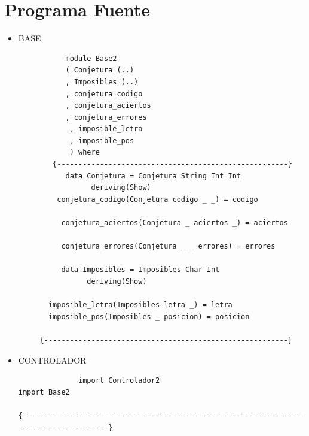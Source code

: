 \section{Programa Fuente}

 \begin{itemize}
      \item BASE

        \begin{verbatim}
           module Base2
           ( Conjetura (..)
           , Imposibles (..)
           , conjetura_codigo
           , conjetura_aciertos
           , conjetura_errores
            , imposible_letra
            , imposible_pos
            ) where
        {------------------------------------------------------}
           data Conjetura = Conjetura String Int Int
                 deriving(Show)
         conjetura_codigo(Conjetura codigo _ _) = codigo

          conjetura_aciertos(Conjetura _ aciertos _) = aciertos

          conjetura_errores(Conjetura _ _ errores) = errores 

          data Imposibles = Imposibles Char Int
                deriving(Show)

       imposible_letra(Imposibles letra _) = letra
       imposible_pos(Imposibles _ posicion) = posicion

     {---------------------------------------------------------}
      \end{verbatim}
          \item CONTROLADOR

                \begin{verbatim}
              import Controlador2
import Base2

{---------------------------------------------------------------------------------------}


\end{verbatim}
\end{itemize}
